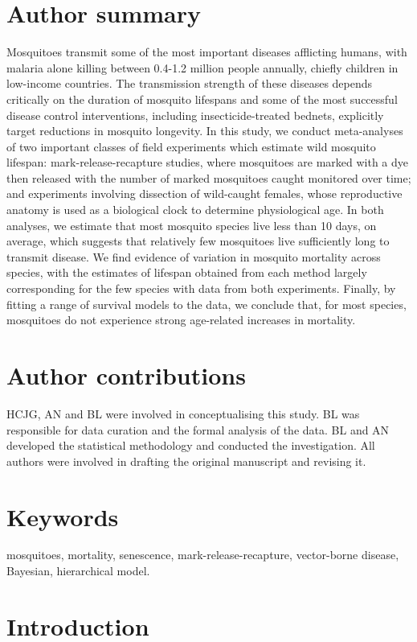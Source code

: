 \documentclass[]{article}
\begin{document}
\section{Author summary}
Mosquitoes transmit some of the most important diseases afflicting humans, with malaria alone killing between 0.4-1.2 million people annually, chiefly children in low-income countries. The transmission strength of these diseases depends critically on the duration of mosquito lifespans and some of the most successful disease control interventions, including insecticide-treated bednets, explicitly target reductions in mosquito longevity. In this study, we conduct meta-analyses of two important classes of field experiments which estimate wild mosquito lifespan: mark-release-recapture studies, where mosquitoes are marked with a dye then released with the number of marked mosquitoes caught monitored over time; and experiments involving dissection of wild-caught females, whose reproductive anatomy is used as a biological clock to determine physiological age. In both analyses, we estimate that most mosquito species live less than 10 days, on average, which suggests that relatively few mosquitoes live sufficiently long to transmit disease. We find evidence of variation in mosquito mortality across species, with the estimates of lifespan obtained from each method largely corresponding for the few species with data from both experiments. Finally, by fitting a range of survival models to the data, we conclude that, for most species, mosquitoes do not experience strong age-related increases in mortality.

\section{Author contributions}
HCJG, AN and BL were involved in conceptualising this study. BL was responsible for data curation and the formal analysis of the data. BL and AN developed the statistical methodology and conducted the investigation. All authors were involved in drafting the original manuscript and revising it.

\section{Keywords}\label{keywords}

mosquitoes, mortality, senescence, mark-release-recapture, vector-borne disease, Bayesian, hierarchical model.

\section{Introduction}\label{introduction}
\end{document}
